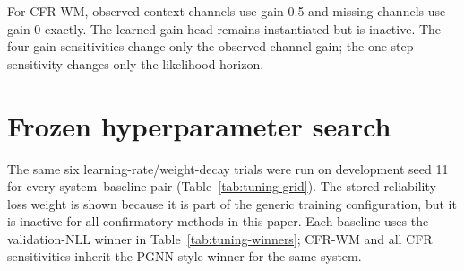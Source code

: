 \begin{table}[ht]
\centering
\scriptsize
\caption{Exact compact transition architectures used in the confirmatory grid.
The bounded correction is $0.25\tanh(\cdot)$ and all forecast covariances are
diagonal.}
\label{tab:architectures}
\end{table}

For CFR-WM, observed context channels use gain 0.5 and missing channels use
gain 0 exactly. The learned gain head remains instantiated but is inactive.
The four gain sensitivities change only the observed-channel gain; the
one-step sensitivity changes only the likelihood horizon.

\section{Frozen hyperparameter search}

The same six learning-rate/weight-decay trials were run on development seed 11
for every system--baseline pair (Table~\ref{tab:tuning-grid}). The stored
reliability-loss weight is shown because it is part of the generic training
configuration, but it is inactive for all confirmatory methods in this paper.
Each baseline uses the validation-NLL winner in
Table~\ref{tab:tuning-winners}; CFR-WM and all CFR sensitivities inherit the
PGNN-style winner for the same system.

